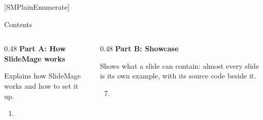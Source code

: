 
[SMPlainEnumerate]
\begin{standardframe}{Contents}
	\small
	\SMDeckAgenda
	\par\medskip
	\begin{columns}[t,onlytextwidth]
		\begin{column}{0.48\linewidth}
			\textcolor{c_primary_highlight}{\textbf{Part A: How SlideMage works}}\par\smallskip
			\parbox[t][3\baselineskip][t]{\linewidth}{Explains how SlideMage works and how to set it up.\strut}\par\smallskip\prevdepth=0pt
			\begin{enumerate}
				\tableofcontents[sections={1-6},hideallsubsections]
				\ifnum\value{enumi}=0 \item[] \fi
			\end{enumerate}
		\end{column}
		\begin{column}{0.48\linewidth}
			\textcolor{c_primary_highlight}{\textbf{Part B: Showcase}}\par\smallskip
			\parbox[t][3\baselineskip][t]{\linewidth}{Shows what a slide can contain: almost every slide is its own example, with its source code beside it.\strut}\par\smallskip\prevdepth=0pt
			\begin{enumerate}
				\setcounter{enumi}{6}
				\tableofcontents[sections={7-12},hideallsubsections]
				\ifnum\value{enumi}=6 \item[] \fi
			\end{enumerate}
		\end{column}
	\end{columns}
\end{standardframe}
